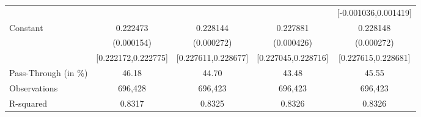 {\begin{tabular}{l*{4}{c}}
                    &                     &                     &                     &[-0.001036,0.001419]         \\
Constant            &    0.222473\sym{***}&    0.228144\sym{***}&    0.227881\sym{***}&    0.228148\sym{***}\\
                    &  (0.000154)         &  (0.000272)         &  (0.000426)         &  (0.000272)         \\
                    &[0.222172,0.222775]         &[0.227611,0.228677]         &[0.227045,0.228716]         &[0.227615,0.228681]         \\
\midrule
Pass-Through (in \%)&       46.18         &       44.70         &       43.48         &       45.55         \\
Observations        &     696,428         &     696,423         &     696,423         &     696,423         \\
R-squared           &      0.8317         &      0.8325         &      0.8326         &      0.8326         \\
\bottomrule
\end{tabular}
}
